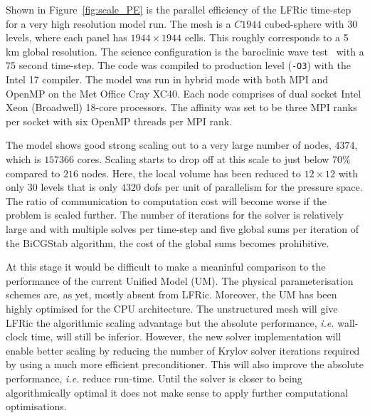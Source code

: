 \documentclass[review,times]{elsarticle}
\begin{document}
Shown in Figure~\ref{fig:scale_PE} is 
the parallel efficiency of the LFRic time-step for a very high 
resolution model run. The mesh is a $C1944$ cubed-sphere with 30 
levels, where each panel has $1944 \times 1944$ cells. This roughly corresponds 
to a 5 km global resolution. The science configuration is the baroclinic wave 
test~\cite{qj.2241} with a 75 second time-step. The code was compiled 
to production level (\verb+-O3+) with the Intel 17 compiler. The model 
was run in hybrid mode with both MPI and OpenMP on the Met Office Cray 
XC40. Each node comprises of dual socket Intel Xeon (Broadwell) 
18-core processors. The affinity was set to be three MPI ranks per 
socket with six OpenMP threads per MPI rank. 

The model shows good strong scaling out to a very large number of nodes,
$4374$, which is $157366$ cores. Scaling starts to drop off at this
scale to just below $70\%$ compared to $216$ nodes. Here, the local
volume has been reduced to $12\times 12$ with only $30$ levels that is
only $4320$ dofs per unit of parallelism for the pressure space. The
ratio of communication to computation cost will become worse if the
problem is scaled further. The number of iterations for the
solver is relatively large and with multiple solves per time-step and
five global sums per iteration of the BiCGStab algorithm, the
cost of the global sums becomes prohibitive.

At this stage it would be difficult to make a meaninful comparison to the performance of the current Unified
Model (UM). The physical parameterisation schemes are, as yet,
mostly absent from LFRic. Moreover, the UM has been
highly optimised for the CPU architecture. The unstructured mesh will
give LFRic the algorithmic scaling advantage but the absolute
performance, {\em i.e.} wall-clock time, will still be
inferior. However, the new solver implementation will enable better scaling by reducing
the number of Krylov solver iterations required by using a much more
efficient preconditioner. This will also improve the absolute
performance, {\em i.e.} reduce run-time. Until the solver is closer to
being algorithmically optimal it does not make sense to apply further
computational optimisations.
\end{document}
